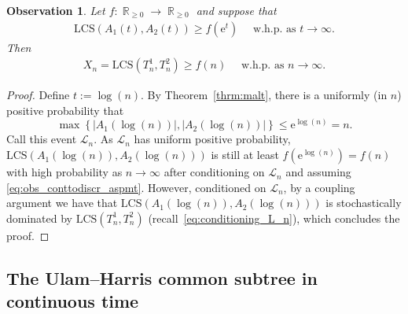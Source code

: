 \documentclass[11pt]{article}
\numberwithin{equation}{section}
\DeclareMathOperator{\R}{\mathbb{R}} %
\newcommand{\MCST}{\mathrm{LCS}} %
\newcommand{\e}{\mathrm e}
\newtheorem{observation}[theorem]{Observation}
\theoremstyle{definition}
\begin{document}
\begin{observation}\label{obs:conttodiscr}
    Let $f:\R_{\geq 0} \to \R_{\geq 0}$ 
    and suppose that
    \begin{align}\label{eq:obs_conttodiscr_aspmt}
        \MCST\left( A_1(t), A_2(t) \right) \geq f(\e^t) \quad \text{ w.h.p. as } t\to \infty. 
    \end{align}
    Then
    \begin{align}\label{eq:obs_conttodiscr}
        X_n = \MCST \left( T_n^1, T_n^2 \right) \geq f(n) \quad \text{ w.h.p. as } n \to \infty.
    \end{align}
\end{observation}

\begin{proof}
    Define $t := \log(n) $. By Theorem~\ref{thrm:malt}, there is a uniformly (in $n$) positive probability that
    \begin{equation}\label{eq:conditioning_L_n}
        \max \left\{ |A_{1} \left( \log(n) \right)| , \left| A_{2} \left( \log(n) \right) \right| \right\}
        \leq \e^{\log(n)} = n.
    \end{equation}
    Call this event $\mathcal{L}_n$. As $\mathcal{L}_n$ has uniform positive probability, $\MCST\left( A_1(\log(n)), A_2(\log(n)) \right)$ is still at least $f\left( \e^{\log(n)} \right) = f(n)$ with high probability as $n \to \infty$ after conditioning on $\mathcal{L}_n$ and assuming \eqref{eq:obs_conttodiscr_aspmt}. However, conditioned on $\mathcal{L}_{n}$, by a coupling argument we have that $\MCST\left( A_1(\log(n)), A_2(\log(n)) \right)$ is stochastically dominated by $\MCST \left( T_n^1, T_n^2 \right)$ (recall~\eqref{eq:conditioning_L_n}), which concludes the proof.
\end{proof}

\subsection{The Ulam--Harris common subtree in continuous time}\label{sec:UH_conts_time}
\end{document}
